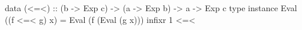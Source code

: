 \begin{code}
data (<=<)
    :: (b -> Exp c)
    -> (a -> Exp b)
    -> a -> Exp c
type instance Eval ((f <=< g) x) =
  Eval (f (Eval (g x)))
infixr 1 <=<
\end{code}
